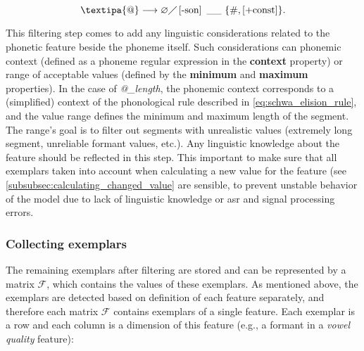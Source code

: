 \begin{equation}
	\label{eq:schwa_elision_rule}
	\text{\textipa{@}}\longrightarrow \varnothing \diagup
	\left[\text{-son}\right] \ \_\_ \ \{\text{\#}, \left[\text{+const}\right]\}.
\end{equation}

This filtering step comes to add any linguistic considerations related to the phonetic feature beside the phoneme itself.
Such considerations can phonemic context (defined as a phoneme regular expression in the \textbf{context} property) or range of acceptable values (defined by the \textbf{minimum} and \textbf{maximum} properties).
In the case of \textit{@\_length}, the phonemic context corresponds to a (simplified) context of the phonological rule described in \cref{eq:schwa_elision_rule}, and the value range defines the minimum and maximum length of the segment.
The range's goal is to filter out segments with unrealistic values (extremely long segment, unreliable formant values, etc.).
Any linguistic knowledge about the feature should be reflected in this step.
This important to make sure that all exemplars taken into account when calculating a new value for the feature (see \cref{subsubsec:calculating_changed_value} are sensible, to prevent unstable behavior of the model due to lack of linguistic knowledge or \ac{asr} and signal processing errors.

\subsubsection{Collecting exemplars}
\label{subsubsec:collecting_exemplars}


The remaining exemplars after filtering are stored and can be represented by a matrix $\mathcal{F}$, which contains the values of these exemplars.
As mentioned above, the exemplars are detected based on definition of each feature separately, and therefore each matrix $\mathcal{F}$ contains exemplars of a single feature.
Each exemplar is a row and each column is a dimension of this feature (e.g., a formant in a \textit{vowel quality} feature):

